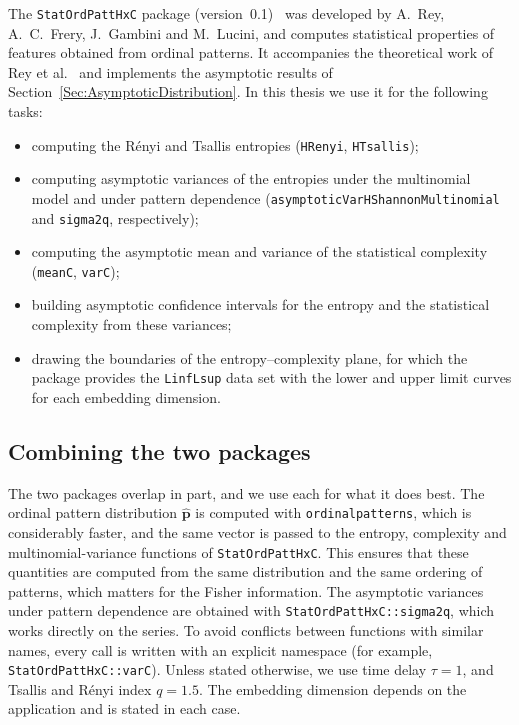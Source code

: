 The \texttt{StatOrdPattHxC} package (version~0.1)~\cite{StatOrdPattHxC} was developed by A.~Rey, A.~C.~Frery, J.~Gambini and M.~Lucini, and computes statistical properties of features obtained from ordinal patterns. It accompanies the theoretical work of Rey et al.~\cite{Rey2025,Rey2023a,Rey2024,Rey2023} and implements the asymptotic results of Section~\ref{Sec:AsymptoticDistribution}. In this thesis we use it for the following tasks:
\begin{itemize}
	\item computing the Rényi and Tsallis entropies (\texttt{HRenyi}, \texttt{HTsallis});
	\item computing asymptotic variances of the entropies under the multinomial model and under pattern dependence (\texttt{asymptoticVar\discretionary{-}{}{}HShannon\discretionary{-}{}{}Multinomial} and \texttt{sigma2q}, respectively);
	\item computing the asymptotic mean and variance of the statistical complexity (\texttt{meanC}, \texttt{varC});
	\item building asymptotic confidence intervals for the entropy and the statistical complexity from these variances;
	\item drawing the boundaries of the entropy--complexity plane, for which the package provides the \texttt{LinfLsup} data set with the lower and upper limit curves for each embedding dimension.
\end{itemize}

\subsection{Combining the two packages}

The two packages overlap in part, and we use each for what it does best. The ordinal pattern distribution $\widehat{\mathbf{p}}$ is computed with \texttt{ordinalpatterns}, which is considerably faster, and the same vector is passed to the entropy, complexity and multinomial-variance functions of \texttt{StatOrdPattHxC}. This ensures that these quantities are computed from the same distribution and the same ordering of patterns, which matters for the Fisher information. The asymptotic variances under pattern dependence are obtained with \texttt{StatOrdPattHxC::sigma2q}, which works directly on the series. To avoid conflicts between functions with similar names, every call is written with an explicit namespace (for example, \texttt{StatOrdPattHxC::varC}). Unless stated otherwise, we use time delay $\tau=1$, and Tsallis and R\'enyi index $q=1.5$. The embedding dimension depends on the application and is stated in each case. 

